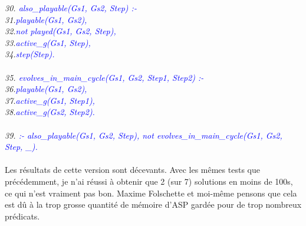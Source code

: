 \documentclass[10pt,a4paper]{article}
\begin{document}
\emph{
	30. \textcolor{blue}{also\_playable(Gs1, Gs2, Step) :-}\\
	31.\qquad\textcolor{blue}{playable(Gs1, Gs2),}\\
	32.\qquad\textcolor{blue}{not played(Gs1, Gs2, Step),}\\
	33.\qquad\textcolor{blue}{active\_g(Gs1, Step),}\\
	34.\qquad\textcolor{blue}{step(Step).}\\ \\
	35. \textcolor{blue}{evolves\_in\_main\_cycle(Gs1, Gs2, Step1, Step2) :-}\\
	36.\qquad\textcolor{blue}{playable(Gs1, Gs2),}\\
	37.\qquad\textcolor{blue}{active\_g(Gs1, Step1),}\\
	38.\qquad\textcolor{blue}{active\_g(Gs2, Step2).}\\ \\
	39. \textcolor{blue}{:- also\_playable(Gs1, Gs2, Step), not evolves\_in\_main\_cycle(Gs1, Gs2, Step, \_).}\\ \\
}
Les résultats de cette version sont décevants. Avec les mêmes tests que précédemment, je n'ai réussi à obtenir que 2 (sur 7) solutions en moins de 100s, ce qui n'est vraiment pas bon. Maxime Folschette et moi-même pensons que cela 
est dû à la trop grosse quantité de mémoire d'ASP gardée pour de trop nombreux prédicats.

\newpage
\end{document}
